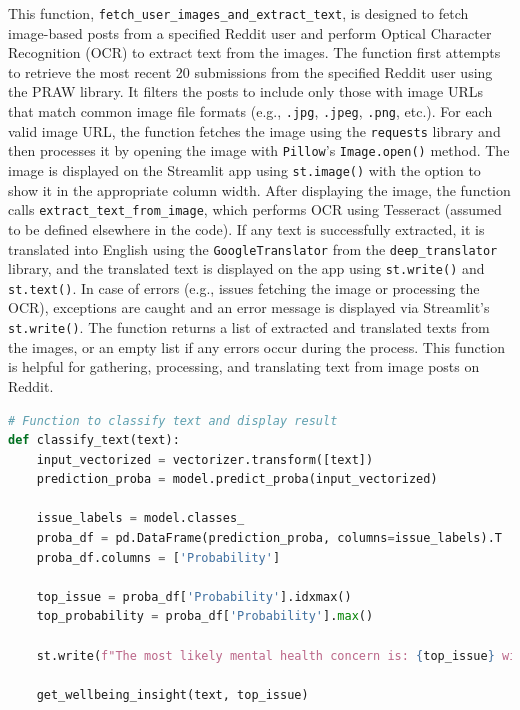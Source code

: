 \noindent
This function, \texttt{fetch\_user\_images\_and\_extract\_text}, is designed to fetch image-based posts from a specified Reddit user and perform Optical Character Recognition (OCR) to extract text from the images. The function first attempts to retrieve the most recent 20 submissions from the specified Reddit user using the PRAW library. It filters the posts to include only those with image URLs that match common image file formats (e.g., \texttt{.jpg}, \texttt{.jpeg}, \texttt{.png}, etc.). For each valid image URL, the function fetches the image using the \texttt{requests} library and then processes it by opening the image with \texttt{Pillow}’s \texttt{Image.open()} method. The image is displayed on the Streamlit app using \texttt{st.image()} with the option to show it in the appropriate column width. After displaying the image, the function calls \texttt{extract\_text\_from\_image}, which performs OCR using Tesseract (assumed to be defined elsewhere in the code). If any text is successfully extracted, it is translated into English using the \texttt{GoogleTranslator} from the \texttt{deep\_translator} library, and the translated text is displayed on the app using \texttt{st.write()} and \texttt{st.text()}. In case of errors (e.g., issues fetching the image or processing the OCR), exceptions are caught and an error message is displayed via Streamlit’s \texttt{st.write()}. The function returns a list of extracted and translated texts from the images, or an empty list if any errors occur during the process. This function is helpful for gathering, processing, and translating text from image posts on Reddit.


\begin{tcolorbox}[colback=gray!5!white, colframe=gray!80!black, boxrule=0.5pt, title=Classifying Text and Displaying Results]
    \begin{lstlisting}[language=Python]
# Function to classify text and display result
def classify_text(text):
    input_vectorized = vectorizer.transform([text])
    prediction_proba = model.predict_proba(input_vectorized)

    issue_labels = model.classes_
    proba_df = pd.DataFrame(prediction_proba, columns=issue_labels).T
    proba_df.columns = ['Probability']

    top_issue = proba_df['Probability'].idxmax()
    top_probability = proba_df['Probability'].max()

    st.write(f"The most likely mental health concern is: {top_issue} with a probability of {top_probability:.2%}")

    get_wellbeing_insight(text, top_issue)
    \end{lstlisting}
\end{tcolorbox}

